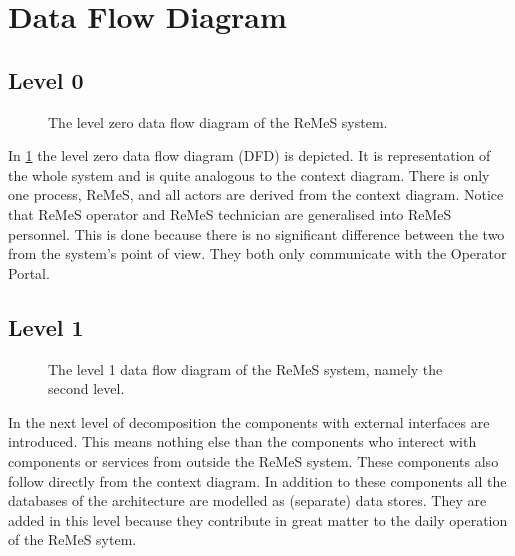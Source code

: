\section{Data Flow Diagram}
\label{sec:data-flow-diagram}

\subsection{Level 0}

\begin{figure}[H]
	\begin{centering}
		\caption{The level zero data flow diagram of the ReMeS system.}
		\label{fig:data-flow-diagram-lvl0}
	\end{centering}
\end{figure}

\npar In \ref{fig:data-flow-diagram-lvl0} the level zero data flow diagram (DFD)
is depicted. It is representation of the whole system and is quite analogous to
the context diagram. There is only one process, ReMeS, and all actors are
derived from the context diagram. Notice that ReMeS operator and ReMeS
technician are generalised into ReMeS personnel. This is done because there is
no significant difference between the two from the system's point of view. They
both only communicate with the Operator Portal.

\subsection{Level 1}

\begin{figure}[H]
	\begin{centering}
		\caption{The level 1 data flow diagram of the ReMeS system, namely the
		second level.}
		\label{fig:data-flow-diagram-lvl1}
	\end{centering}
\end{figure} 

\npar In the next level of decomposition the components with external interfaces
are introduced. This means nothing else than the components who interect with
components or services from outside the ReMeS system. These components also
follow directly from the context diagram. In addition to these components all
the databases of the architecture are modelled as (separate) data stores. They
are added in this level because they contribute in great matter to the daily
operation of the ReMeS sytem. 

